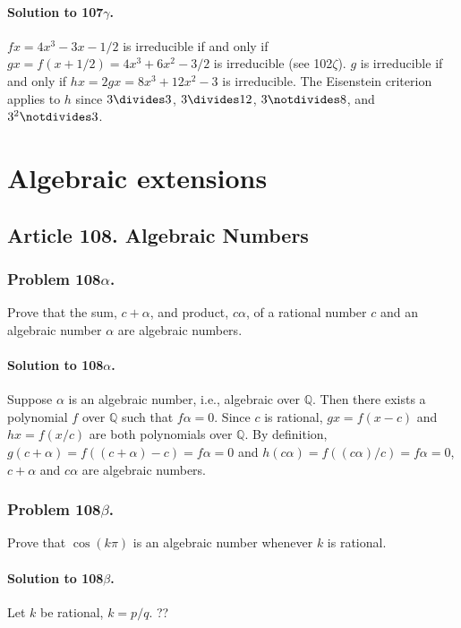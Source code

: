 \paragraph*{Solution to 107$\gamma$.}
$fx = 4x^3 - 3x - 1/2$ is irreducible if and only if $gx = f(x+1/2) =
4x^3 + 6x^2 - 3/2$ is irreducible (see 102$\zeta$). $g$ is irreducible if and
only if $hx = 2gx = 8x^3 + 12x^2 - 3$ is irreducible. The Eisenstein criterion
applies to $h$ since $3 \divides 3$, $3 \divides 12$, $3 \notdivides 8$, and
$3^2 \notdivides 3$.


\section{Algebraic extensions}


\subsection{Article 108. Algebraic Numbers}

\subsubsection{Problem 108$\alpha$.}
Prove that the sum, $c + \alpha$, and product, $c\alpha$, of a rational number
$c$ and an algebraic number $\alpha$ are algebraic numbers.

\paragraph*{Solution to 108$\alpha$.}
Suppose $\alpha$ is an algebraic number, i.e., algebraic over $\mathbb{Q}$. Then
there exists a polynomial $f$ over $\mathbb{Q}$ such that $f\alpha = 0$. Since
$c$ is rational, $gx = f(x-c)$ and $hx = f(x/c)$ are both polynomials over
$\mathbb{Q}$. By definition, $g(c+\alpha) = f((c+\alpha)-c) = f\alpha = 0$
and $h(c\alpha) = f((c\alpha)/c) = f\alpha = 0$, $c+\alpha$ and $c\alpha$
are algebraic numbers.

\subsubsection{Problem 108$\beta$.}
Prove that $\cos (k\pi)$ is an algebraic number whenever $k$ is rational.

\paragraph*{Solution to 108$\beta$.}
Let $k$ be rational, $k = p/q$. ??
